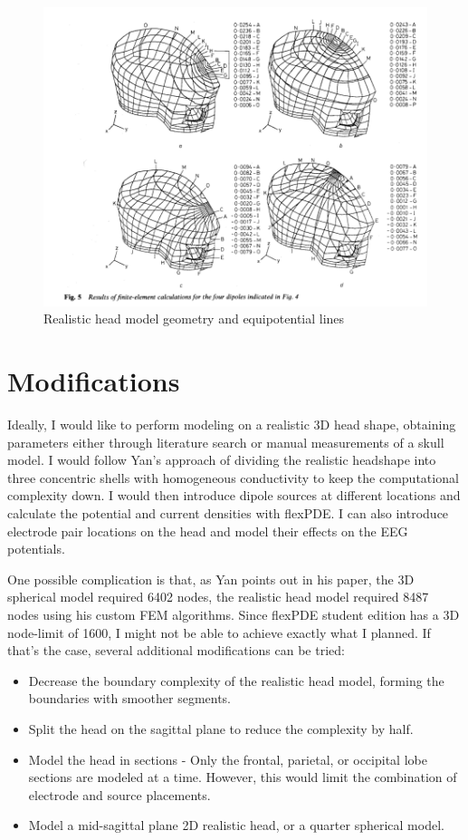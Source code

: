 \documentclass{article}
\begin{document}
\begin{figure}[H]
    \begin{center}
        \includegraphics[scale=0.5]{headall.png}
        \caption{Realistic head model geometry and equipotential lines \cite{Yan}}
    \end{center}
\end{figure}

\section{Modifications}
Ideally, I would like to perform modeling on a realistic 3D head shape, obtaining parameters either through literature search or manual measurements of a skull model. I would follow Yan's approach of dividing the realistic headshape into three concentric shells with homogeneous conductivity to keep the computational complexity down. I would then introduce dipole sources at different locations and calculate the potential and current densities with flexPDE. I can also introduce electrode pair locations on the head and model their effects on the EEG potentials.

One possible complication is that, as Yan points out in his paper, the 3D spherical model required 6402 nodes, the realistic head model required 8487 nodes using his custom FEM algorithms. Since flexPDE student edition has a 3D node-limit of 1600, I might not be able to achieve exactly what I planned. If that's the case, several additional modifications can be tried:
\begin{itemize}
    \item Decrease the boundary complexity of the realistic head model, forming the boundaries with smoother segments.
    \item Split the head on the sagittal plane to reduce the complexity by half.
    \item Model the head in sections - Only the frontal, parietal, or occipital lobe sections are modeled at a time. However, this would limit the combination of electrode and source placements.
    \item Model a mid-sagittal plane 2D realistic head, or a quarter spherical model.
\end{itemize}
\end{document}
